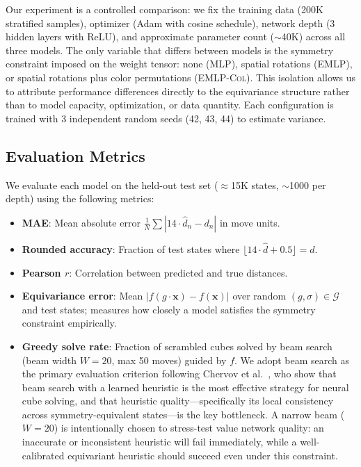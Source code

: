 \documentclass[11pt]{article}
\newcommand{\bx}{\mathbf{x}}
\begin{document}
Our experiment is a controlled comparison: we fix the training data
(200K stratified samples), optimizer (Adam with cosine schedule), network
depth (3 hidden layers with ReLU), and approximate parameter count
(${\sim}$40K) across all three models.
The only variable that differs between models is the symmetry
constraint imposed on the weight tensor: none (\textsc{MLP}), spatial
rotations (\textsc{EMLP}), or spatial rotations plus color permutations
(\textsc{EMLP-Col}).
This isolation allows us to attribute performance differences directly to
the equivariance structure rather than to model capacity, optimization, or
data quantity.
Each configuration is trained with 3 independent random seeds (42, 43, 44)
to estimate variance.

\subsection{Evaluation Metrics}

We evaluate each model on the held-out test set ($\approx$15K states,
$\sim$1000 per depth) using the following metrics:

\begin{itemize}
  \item \textbf{MAE}: Mean absolute error $\frac{1}{N}\sum |14 \cdot \hat{d}_n - d_n|$ in move units.
  \item \textbf{Rounded accuracy}: Fraction of test states where
    $\lfloor 14 \cdot \hat{d} + 0.5 \rfloor = d$.
  \item \textbf{Pearson $r$}: Correlation between predicted and true distances.
  \item \textbf{Equivariance error}: Mean $|f(g \cdot \bx) - f(\bx)|$ over
    random $(g,\sigma) \in \mathcal{G}$ and test states; measures how closely
    a model satisfies the symmetry constraint empirically.
  \item \textbf{Greedy solve rate}: Fraction of scrambled cubes solved by
    beam search (beam width $W = 20$, max 50 moves) guided by $f$.
    We adopt beam search as the primary evaluation criterion following
    Chervov et al.~\cite{chervov2025cayleypy}, who show that beam search
    with a learned heuristic is the most effective strategy for neural cube
    solving, and that heuristic quality—specifically its local consistency
    across symmetry-equivalent states—is the key bottleneck.
    A narrow beam ($W = 20$) is intentionally chosen to stress-test value
    network quality: an inaccurate or inconsistent heuristic will fail
    immediately, while a well-calibrated equivariant heuristic should
    succeed even under this constraint.
\end{itemize}
\end{document}
